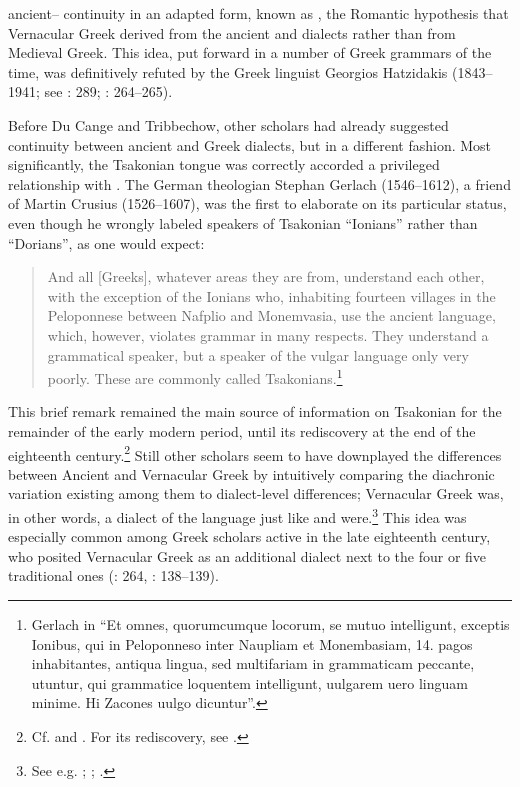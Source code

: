ancient– continuity in an adapted form, known as , the Romantic hypothesis that Vernacular Greek derived from the ancient  and  dialects rather than from Medieval Greek. This idea, put forward in a number of Greek grammars of the time, was definitively refuted by the Greek linguist Georgios Hatzidakis (1843–1941; see \citealt{Argyropoulos2009}: 289; \citealt{Mackridge2009}: 264–265).

Before Du Cange and Tribbechow, other scholars had already suggested continuity between ancient and  Greek dialects, but in a different fashion. Most significantly, the Tsakonian tongue was correctly accorded a privileged relationship with . The German theologian Stephan Gerlach (1546–1612), a friend of Martin Crusius (1526–1607), was the first to elaborate on its particular status, even though he wrongly labeled speakers of Tsakonian “Ionians” rather than “Dorians”, as one would expect:\largerpage[2]

\begin{quote}
And all [Greeks], whatever areas they are from, understand each other, with the exception of the Ionians who, inhabiting fourteen villages in the Peloponnese between Nafplio and Monemvasia, use the ancient language, which, however, violates grammar in many respects. They understand a grammatical speaker, but a speaker of the vulgar language only very poorly. These are commonly called Tsakonians.\footnote{Gerlach in \citet[489]{Crusius1584} “Et omnes, quorumcumque locorum, se mutuo intelligunt, exceptis Ionibus, qui in Peloponneso inter Naupliam et Monembasiam, 14. pagos inhabitantes, antiqua lingua, sed multifariam in grammaticam peccante, utuntur, qui grammatice loquentem intelligunt, uulgarem uero linguam minime. Hi Zacones uulgo dicuntur”.}
\end{quote}

This brief remark remained the main source of information on Tsakonian for the remainder of the early modern period, until its rediscovery at the end of the eighteenth century.\footnote{Cf. \citet[44]{Howell1650a} and \citet[vii]{Du1688}. For its rediscovery, see \citet{Famerie2007}.} Still other scholars seem to have downplayed the differences between Ancient and Vernacular Greek by intuitively comparing the diachronic variation existing among them to dialect-level differences; Vernacular Greek was, in other words, a dialect of the language just like  and  were.\footnote{See e.g. \citet[47--48]{Castillo1678}; \citet[\textsc{i.}184, 4th sequence of pagination]{Chambers1728}; \citet[127--128]{Freret1809}.} This idea was especially common among Greek scholars active in the late eighteenth century, who posited Vernacular Greek as an additional dialect next to the four or five traditional ones (\citealt{Mackridge2009}: 264, \citealt{Mackridge2014}: 138--139).\largerpage

